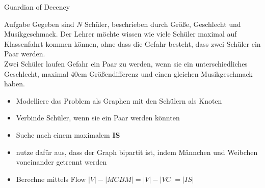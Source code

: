 \begin{frame}{Guardian of Decency}
	\vspace{-0.3cm}
	\begin{block}{Aufgabe}
		Gegeben sind $N$ Schüler, beschrieben durch Größe, Geschlecht und Musikgeschmack. Der Lehrer möchte wissen wie viele Schüler maximal auf Klassenfahrt kommen können, ohne dass die Gefahr besteht, dass zwei Schüler ein Paar werden.\\\pause
		Zwei Schüler laufen Gefahr ein Paar zu werden, wenn sie ein unterschiedliches Geschlecht, maximal 40cm Größendifferenz und einen gleichen Musikgeschmack haben.
	\end{block}
	\pause
	\begin{itemize}
		\setlength\itemsep{0.05em}
		\item Modelliere das Problem als Graphen mit den Schülern als Knoten
		\item Verbinde Schüler, wenn sie ein Paar werden könnten
		\pause
		\item Suche nach einem maximalem \textbf{IS}
		\pause
		\item nutze dafür aus, dass der Graph bipartit ist, indem Männchen und Weibchen voneinander getrennt werden
		\item Berechne mittels Flow $|V|-|MCBM|=|V|-|VC|=|IS|$
	\end{itemize}
\end{frame}